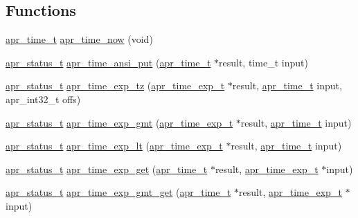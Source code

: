 \subsection*{Functions}
\begin{DoxyCompactItemize}
\item 
\hyperlink{group__apr__time_gadb4bde16055748190eae190c55aa02bb}{apr\+\_\+time\+\_\+t} \hyperlink{group__apr__time_gac5cb8713d0681d7b809169a222512287}{apr\+\_\+time\+\_\+now} (void)
\item 
\hyperlink{group__apr__errno_gaf76ee4543247e9fb3f3546203e590a6c}{apr\+\_\+status\+\_\+t} \hyperlink{group__apr__time_gac2fec71f18b4a286b2e21f0b74fadce8}{apr\+\_\+time\+\_\+ansi\+\_\+put} (\hyperlink{group__apr__time_gadb4bde16055748190eae190c55aa02bb}{apr\+\_\+time\+\_\+t} $\ast$result, time\+\_\+t input)
\item 
\hyperlink{group__apr__errno_gaf76ee4543247e9fb3f3546203e590a6c}{apr\+\_\+status\+\_\+t} \hyperlink{group__apr__time_gaaf3b8ba123feaa0af5a5975b9a8ab8b1}{apr\+\_\+time\+\_\+exp\+\_\+tz} (\hyperlink{structapr__time__exp__t}{apr\+\_\+time\+\_\+exp\+\_\+t} $\ast$result, \hyperlink{group__apr__time_gadb4bde16055748190eae190c55aa02bb}{apr\+\_\+time\+\_\+t} input, apr\+\_\+int32\+\_\+t offs)
\item 
\hyperlink{group__apr__errno_gaf76ee4543247e9fb3f3546203e590a6c}{apr\+\_\+status\+\_\+t} \hyperlink{group__apr__time_gafa8bdd3a4500f66866d8dd54bf69fb71}{apr\+\_\+time\+\_\+exp\+\_\+gmt} (\hyperlink{structapr__time__exp__t}{apr\+\_\+time\+\_\+exp\+\_\+t} $\ast$result, \hyperlink{group__apr__time_gadb4bde16055748190eae190c55aa02bb}{apr\+\_\+time\+\_\+t} input)
\item 
\hyperlink{group__apr__errno_gaf76ee4543247e9fb3f3546203e590a6c}{apr\+\_\+status\+\_\+t} \hyperlink{group__apr__time_ga34d3b9858de1d3111a4b2ff936ada7f6}{apr\+\_\+time\+\_\+exp\+\_\+lt} (\hyperlink{structapr__time__exp__t}{apr\+\_\+time\+\_\+exp\+\_\+t} $\ast$result, \hyperlink{group__apr__time_gadb4bde16055748190eae190c55aa02bb}{apr\+\_\+time\+\_\+t} input)
\item 
\hyperlink{group__apr__errno_gaf76ee4543247e9fb3f3546203e590a6c}{apr\+\_\+status\+\_\+t} \hyperlink{group__apr__time_gac13166685922464d9848bda469e0b3b7}{apr\+\_\+time\+\_\+exp\+\_\+get} (\hyperlink{group__apr__time_gadb4bde16055748190eae190c55aa02bb}{apr\+\_\+time\+\_\+t} $\ast$result, \hyperlink{structapr__time__exp__t}{apr\+\_\+time\+\_\+exp\+\_\+t} $\ast$input)
\item 
\hyperlink{group__apr__errno_gaf76ee4543247e9fb3f3546203e590a6c}{apr\+\_\+status\+\_\+t} \hyperlink{group__apr__time_ga0f9fdeae48a45662cb3f198d06c743f0}{apr\+\_\+time\+\_\+exp\+\_\+gmt\+\_\+get} (\hyperlink{group__apr__time_gadb4bde16055748190eae190c55aa02bb}{apr\+\_\+time\+\_\+t} $\ast$result, \hyperlink{structapr__time__exp__t}{apr\+\_\+time\+\_\+exp\+\_\+t} $\ast$input)

\end{DoxyCompactItemize}

